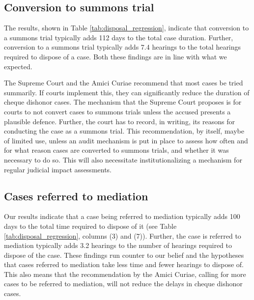 \documentclass[12pt,a4paper]{article}
\begin{document}
	\subsection{Conversion to summons trial}
	\label{sec:conv -summ-trial-1}
	
	The results, shown in Table \ref{tab:disposal_regression}, indicate that conversion to a summons trial typically adds 112 days to the total case duration. Further, conversion to a summons trial typically adds 7.4 hearings to the total hearings required to dispose of a case. Both these findings are in line with what we expected.
	
	The Supreme Court and the Amici Curiae recommend that most cases be tried summarily. If courts implement this, they can significantly reduce the duration of cheque dishonor cases. The mechanism that the Supreme Court proposes is for courts to not convert cases to summons trials unless the accused presents a plausible defence. Further, the court has to record, in writing, its reasons for conducting the case as a summons trial. This recommendation, by itself, maybe of limited use, unless an audit mechanism is put in place to assess how often and for what reason cases are converted to summons trials, and whether it was necessary to do so. This will also necessitate institutionalizing a mechanism for regular judicial impact assessments.
	
	\subsection{Cases referred to mediation}
	\label{sec:mediation}
	
	Our results indicate that a case being referred to mediation typically adds 100 days to the total time required to dispose of it (see Table \ref{tab:disposal_regression}, columns (3) and (7)). Further, the case is referred to mediation typically adds 3.2 hearings to the number of hearings required to dispose of the case. These findings run counter to our belief and the hypotheses that cases referred to mediation take less time and fewer hearings to dispose of. %
	This also means that the recommendation by the Amici Curiae, calling for more cases to be referred to mediation, will not reduce the delays in cheque dishonor cases. 
	
\end{document}
